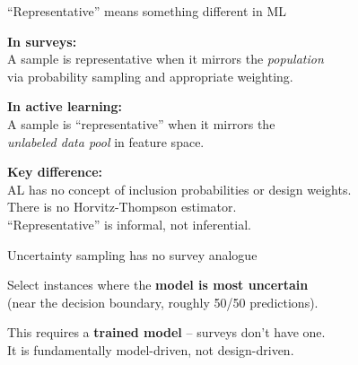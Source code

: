 \documentclass[aspectratio=169,11pt]{beamer}
\begin{document}
\begin{frame}{``Representative'' means something different in ML}

\textbf{In surveys:}\\
A sample is representative when it mirrors the \textit{population}\\
via probability sampling and appropriate weighting.

\vspace{1em}

\textbf{In active learning:}\\
A sample is ``representative'' when it mirrors the\\
\textit{unlabeled data pool} in feature space.

\vspace{1em}

\textbf{Key difference:}\\
AL has no concept of inclusion probabilities or design weights.\\
There is no Horvitz-Thompson estimator.\\
``Representative'' is informal, not inferential.
\end{frame}

\begin{frame}{Uncertainty sampling has no survey analogue}

Select instances where the \textbf{model is most uncertain}\\
(near the decision boundary, roughly 50/50 predictions).

\vspace{1em}

\begin{center}
\end{center}

This requires a \textbf{trained model} -- surveys don't have one.\\
It is fundamentally model-driven, not design-driven.
\end{frame}
\end{document}
